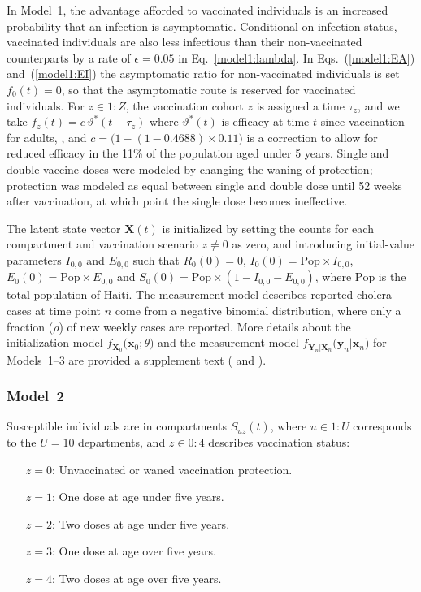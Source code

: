 \documentclass[10pt,letterpaper]{article}\usepackage[]{graphicx}\usepackage[table]{xcolor}
\newcommand\vaccineEfficacy{\vartheta}
\newcommand\symptomFrac{f}
\newcommand\asymptomRelativeInfect{\epsilon}
\newcommand\reportRate{\rho}
\newcommand\vaccClass{Z}
\newcommand\vaccCounter{z}
\newcommand\paramVec{\theta}
\newcommand\myeqref[1]{(\ref{#1})}
\newcommand\seq[2]{{#1}\!:\!{#2}}
\begin{document}
In Model~1, the advantage afforded to vaccinated individuals is an increased probability that an infection is asymptomatic.
Conditional on infection status, vaccinated individuals are also less infectious than their non-vaccinated counterparts by a rate of $\asymptomRelativeInfect = 0.05$ in Eq.~\eqref{model1:lambda}.
In Eqs.~\myeqref{model1:EA} and~\myeqref{model1:EI} the asymptomatic ratio for non-vaccinated individuals is set $\symptomFrac_0(t)=0$, so that the asymptomatic route is reserved for vaccinated individuals.
For $\vaccCounter\in\seq{1}{\vaccClass}$, the vaccination cohort $\vaccCounter$ is assigned a time $\tau_{\vaccCounter}$, and we take $\symptomFrac_\vaccCounter(t) = c \, \vaccineEfficacy^*(t-\tau_{\vaccCounter})$
where $\vaccineEfficacy^*(t)$ is efficacy at time $t$ since vaccination for adults,  , and $c=\big(1-(1-0.4688)\times 0.11\big)$ is a correction to allow for reduced efficacy in the 11\% of the population aged under 5 years.
Single and double vaccine doses were modeled by changing the waning of protection; protection was modeled as equal between single and double dose until 52 weeks after vaccination, at which point the single dose becomes ineffective.

The latent state vector $\bm{X}(t)$ is initialized by setting the counts for each compartment and vaccination scenario $\vaccCounter \neq 0$ as zero, and introducing initial-value parameters $I_{0,0}$ and $E_{0, 0}$ such that $R_{0}(0) = 0$, $I_{0}(0) = \mathrm{Pop} \times I_{0, 0}$, $E_{0}(0) = \mathrm{Pop} \times E_{0, 0}$ and $S_{0}(0) = \mathrm{Pop} \times (1 - I_{0, 0} - E_{0, 0})$, where $\mathrm{Pop}$ is the total population of Haiti.
The measurement model describes reported cholera cases at time point $n$ come from a negative binomial distribution, where only a fraction ($\reportRate$) of new weekly cases are reported.
More details about the initialization model $f_{\bm{X}_0}\big(\bm{x}_0;\paramVec\big)$ and the measurement model $f_{\bm{Y}_n|\bm{X}_{n}}\big(\bm{y}_n|\bm{x}_{n}\big)$ for Models~1--3 are provided a supplement text ( and ).

\subsubsection*{Model~2}
\label{sec:model2}
Susceptible individuals are in compartments $S_{u\vaccCounter}(t)$, where $u\in\seq{1}{U}$ corresponds to the $U=10$ departments, and $\vaccCounter\in\seq{0}{4}$ describes vaccination status:
\begin{itemize}
  \item[$\vaccCounter=0$:] Unvaccinated or waned vaccination protection.
  \item[$\vaccCounter=1$:] One dose at age under five years.
  \item[$\vaccCounter=2$:] Two doses at age under five years.
  \item[$\vaccCounter=3$:] One dose at age over five years.
  \item[$\vaccCounter=4$:] Two doses at age over five years.
\end{itemize}
\end{document}
